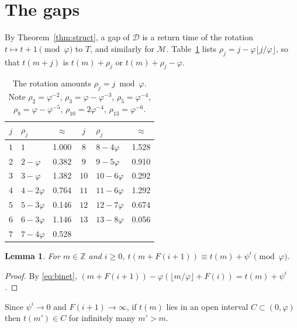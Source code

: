 \documentclass[12pt]{article}
\newcommand{\fl}[1]{\lfloor #1 \rfloor}
\newcommand{\Z}{\mathbb{Z}}
\newcommand{\D}{\mathcal{D}}
\newcommand{\M}{\mathcal{M}}
\theoremstyle{plain}
\newtheorem{lemma}[theorem]{Lemma}
\theoremstyle{remark}
\begin{document}
\section{The gaps}\label{sec:gaps}

By Theorem~\ref{thm:struct}, a gap of $\D$ is a return time of the rotation
$t\mapsto t+1\pmod\varphi$ to $T$, and similarly for $\M$. Table~\ref{tab:rot} lists
$\rho_j=j-\varphi\fl{j/\varphi}$, so that $t(m+j)$ is $t(m)+\rho_j$ or $t(m)+\rho_j-\varphi$.

\begin{table}[ht]
\centering
\small
\setlength{\tabcolsep}{4pt}
\begin{tabular}{clc@{\qquad}clc}
\toprule
$j$ & $\rho_j$ & $\approx$ & $j$ & $\rho_j$ & $\approx$ \\
\midrule
$1$ & $1$ & 1.000 & $8$ & $8-4\varphi$ & 1.528 \\
$2$ & $2-\varphi$ & 0.382 & $9$ & $9-5\varphi$ & 0.910 \\
$3$ & $3-\varphi$ & 1.382 & $10$ & $10-6\varphi$ & 0.292 \\
$4$ & $4-2\varphi$ & 0.764 & $11$ & $11-6\varphi$ & 1.292 \\
$5$ & $5-3\varphi$ & 0.146 & $12$ & $12-7\varphi$ & 0.674 \\
$6$ & $6-3\varphi$ & 1.146 & $13$ & $13-8\varphi$ & 0.056 \\
$7$ & $7-4\varphi$ & 0.528 & & & \\
\bottomrule
\end{tabular}
\caption{The rotation amounts $\rho_j=j\bmod\varphi$. Note $\rho_2=\varphi^{-2}$,
$\rho_3=\varphi-\varphi^{-3}$, $\rho_5=\varphi^{-4}$, $\rho_8=\varphi-\varphi^{-5}$,
$\rho_{10}=2\varphi^{-4}$, $\rho_{13}=\varphi^{-6}$.}
\label{tab:rot}
\end{table}

\begin{lemma}\label{lem:shift}
For $m\in\Z$ and $i\ge0$, $t(m+F(i+1))\equiv t(m)+\psi^i\pmod\varphi$.
\end{lemma}

\begin{proof}
By \eqref{eq:binet}, $(m+F(i+1))-\varphi(\fl{m/\varphi}+F(i))=t(m)+\psi^i$.
\end{proof}

Since $\psi^i\to0$ and $F(i+1)\to\infty$, if $t(m)$ lies in an open interval $C\subset(0,\varphi)$
then $t(m')\in C$ for infinitely many $m'>m$.


\end{document}
